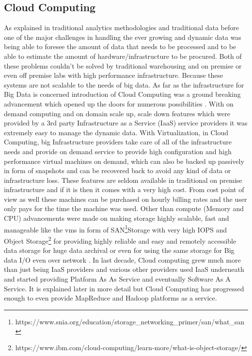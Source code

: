 \documentclass[sigconf]{acmart}
\begin{document}
\subsection{Cloud Computing}
As explained in traditional analytics methodologies and traditional data before one of the major challenges in handling the ever growing and dynamic data was being able to foresee the amount of data that needs to be processed and to be able to estimate the amount of hardware/infrastructure to be procured. Both of these problems couldn't be solved by traditional warehousing and on premise or even off premise labs with high performance infrastructure. Because these systems are not scalable to the needs of big data. As far as the infrastructure for Big Data is concerned introduction of Cloud Computing was a ground breaking advancement which opened up the doors for numerous possibilities  \cite{krishnan}. With on demand computing and on domain scale up, scale down features which were provided by a 3rd party Infrastructure as a Service (IaaS) service providers it was extremely easy to manage the dynamic data. With Virtualization, in Cloud Computing, big Infrastructure providers take care of all of the infrastructure needs and provide on demand service to provide high configuration and high performance virtual machines on demand, which can also be backed up passively in form of snapshots and can be recovered back to avoid any kind of data or infrastructure loss. These features are seldom available in traditional on premise infrastructure and if it is then it comes with a very high cost. From cost point of view as well these machines can be purchased on hourly billing rates and the user only pays for the time the machine was used. Other than compute (Memory and CPU) advancements were made on making storage highly scalable, fast and manageable like the vms in form of SAN\footnote{https://www.snia.org/education/storage\_networking\_primer/san/what\_san}Storage with very high IOPS and Object Storage\footnote{https://www.ibm.com/cloud-computing/learn-more/what-is-object-storage/} for providing highly reliable and easy and remotely accessible data storage for huge data archival or even for using the same storage for Big data I/O even over network \cite{intelstorage}. In last decade, Cloud computing grew much more than just being IaaS providers and various other providers used IaaS underneath and started providing Platform As As Service and eventually Software As A Service. It is explained later in more detail but Cloud Computing has progressed enough to even provide MapReduce and Hadoop platforms as a service.
\end{document}
